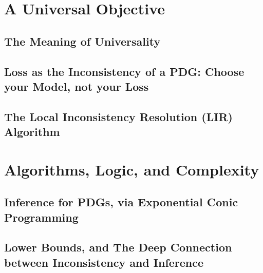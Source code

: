 \documentclass[tocprelim,
    ]{cornellmodified}
\begin{document}
\part{A Universal Objective} \label{part:univ-objective}

\chapter*{The Meaning of Universality}
    

\chapter{Loss as the Inconsistency of a PDG: 
    Choose your Model, not your Loss}
    
\chapter{ The Local Inconsistency Resolution (LIR) Algorithm }
    
    
\part{Algorithms, Logic, and Complexity%
    } \label{part:algo-logic-complexity}

\chapter{Inference for PDGs, via Exponential Conic Programming}
    

\chapter[Lower Bounds, and the Deep Connection\texorpdfstring{\\}{}between Inconsistency and Inference]%
    {Lower Bounds, and The Deep Connection between Inconsistency and Inference}
    
\end{document}
